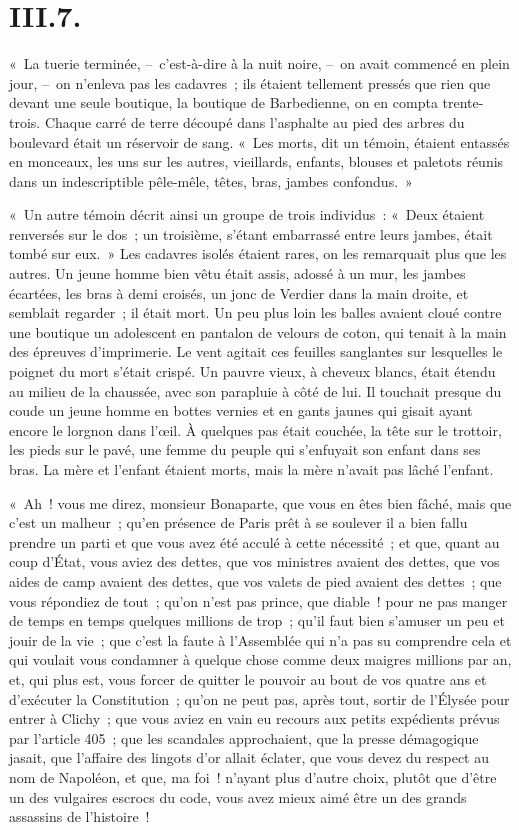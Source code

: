 \documentclass[french,twoside]{book} %
\begin{document}
\section[{III.7.}]{III.7.}

\noindent « La tuerie terminée, – c’est-à-dire à la nuit noire, – on avait commencé en plein jour, – on n’enleva pas les cadavres ; ils étaient tellement pressés que rien que devant une seule boutique, la boutique de Barbedienne, on en compta trente-trois. Chaque carré de terre découpé dans l’asphalte au pied des arbres du boulevard était un réservoir de sang. « Les morts, dit un témoin, étaient entassés en monceaux, les uns sur les autres, vieillards, enfants, blouses et paletots réunis dans un indescriptible pêle-mêle, têtes, bras, jambes confondus. »\par
« Un autre témoin décrit ainsi un groupe de trois individus : « Deux étaient renversés sur le dos ; un troisième, s’étant embarrassé entre leurs jambes, était tombé sur eux. » Les cadavres isolés étaient rares, on les remarquait plus que les autres. Un jeune homme bien vêtu était assis, adossé à un mur, les jambes écartées, les bras à demi croisés, un jonc de Verdier dans la main droite, et semblait regarder ; il était mort. Un peu plus loin les balles avaient cloué contre une boutique un adolescent en pantalon de velours de coton, qui tenait à la main des épreuves d’imprimerie. Le vent agitait ces feuilles sanglantes sur lesquelles le poignet du mort s’était crispé. Un pauvre vieux, à cheveux blancs, était étendu au milieu de la chaussée, avec son parapluie à côté de lui. Il touchait presque du coude un jeune homme en bottes vernies et en gants jaunes qui gisait ayant encore le lorgnon dans l’œil. À quelques pas était couchée, la tête sur le trottoir, les pieds sur le pavé, une femme du peuple qui s’enfuyait son enfant dans ses bras. La mère et l’enfant étaient morts, mais la mère n’avait pas lâché l’enfant.\par
« Ah ! vous me direz, monsieur Bonaparte, que vous en êtes bien fâché, mais que c’est un malheur ; qu’en présence de Paris prêt à se soulever il a bien fallu prendre un parti et que vous avez été acculé à cette nécessité ; et que, quant au coup d’État, vous aviez des dettes, que vos ministres avaient des dettes, que vos aides de camp avaient des dettes, que vos valets de pied avaient des dettes ; que vous répondiez de tout ; qu’on n’est pas prince, que diable ! pour ne pas manger de temps en temps quelques millions de trop ; qu’il faut bien s’amuser un peu et jouir de la vie ; que c’est la faute à l’Assemblée qui n’a pas su comprendre cela et qui voulait vous condamner à quelque chose comme deux maigres millions par an, et, qui plus est, vous forcer de quitter le pouvoir au bout de vos quatre ans et d’exécuter la Constitution ; qu’on ne peut pas, après tout, sortir de l’Élysée pour entrer à Clichy ; que vous aviez en vain eu recours aux petits expédients prévus par l’article 405 ; que les scandales approchaient, que la presse démagogique jasait, que l’affaire des lingots d’or allait éclater, que vous devez du respect au nom de Napoléon, et que, ma foi ! n’ayant plus d’autre choix, plutôt que d’être un des vulgaires escrocs du code, vous avez mieux aimé être un des grands assassins de l’histoire !\par
\end{document}
